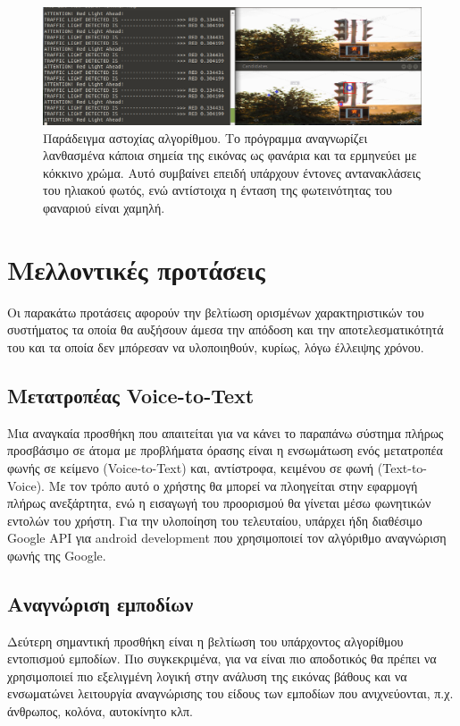 \begin{figure}[H]
    \centering
    \includegraphics[width=\textwidth]{images/test_light5.png}
    \caption{Παράδειγμα αστοχίας αλγορίθμου. Το πρόγραμμα αναγνωρίζει λανθασμένα κάποια σημεία της εικόνας ως φανάρια και τα ερμηνεύει με κόκκινο χρώμα. Αυτό συμβαίνει επειδή υπάρχουν έντονες αντανακλάσεις του ηλιακού φωτός, ενώ αντίστοιχα η ένταση της φωτεινότητας του φαναριού είναι χαμηλή.}
    \label{fig:test-light5}
\end{figure}

\section{Μελλοντικές προτάσεις}
Οι παρακάτω προτάσεις αφορούν την βελτίωση ορισμένων χαρακτηριστικών του συστήματος τα οποία θα αυξήσουν άμεσα την απόδοση και την αποτελεσματικότητά του και τα οποία δεν μπόρεσαν να υλοποιηθούν, κυρίως, λόγω έλλειψης χρόνου.

\subsection{Μετατροπέας Voice-to-Text}
Μια αναγκαία προσθήκη που απαιτείται για να κάνει το παραπάνω σύστημα πλήρως προσβάσιμο σε άτομα με προβλήματα όρασης είναι η ενσωμάτωση ενός μετατροπέα φωνής σε κείμενο (Voice-to-Text) και, αντίστροφα, κειμένου σε φωνή (Text-to-Voice). Με τον τρόπο αυτό ο χρήστης θα μπορεί να πλοηγείται στην εφαρμογή πλήρως ανεξάρτητα, ενώ η εισαγωγή του προορισμού θα γίνεται μέσω φωνητικών εντολών του χρήστη. Για την υλοποίηση του τελευταίου, υπάρχει ήδη διαθέσιμο Google API για android development που χρησιμοποιεί τον αλγόριθμο αναγνώριση φωνής της Google.

\subsection{Αναγνώριση εμποδίων}
Δεύτερη σημαντική προσθήκη είναι η βελτίωση του υπάρχοντος αλγορίθμου εντοπισμού εμποδίων. Πιο συγκεκριμένα, για να είναι πιο αποδοτικός θα πρέπει να χρησιμοποιεί πιο εξελιγμένη λογική στην ανάλυση της εικόνας βάθους και να ενσωματώνει λειτουργία αναγνώρισης του είδους των εμποδίων που ανιχνεύονται, π.χ. άνθρωπος, κολόνα, αυτοκίνητο κλπ.

